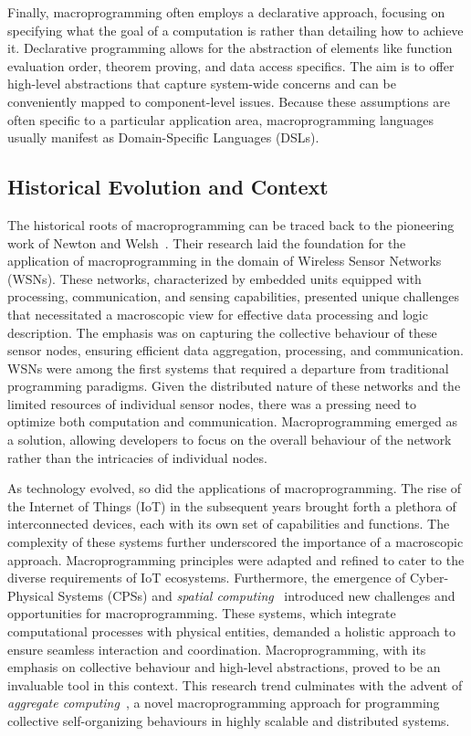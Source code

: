 Finally, macroprogramming often employs a declarative approach, 
 focusing on specifying what the goal of a computation is rather than detailing how to achieve it.
 Declarative programming allows for the abstraction of elements like function evaluation order, 
  theorem proving, and data access specifics. 
  The aim is to offer high-level abstractions that capture system-wide concerns and can be conveniently mapped to component-level issues. 
  Because these assumptions are often specific to a particular application area, macroprogramming languages usually manifest as Domain-Specific Languages (DSLs).
\subsection{Historical Evolution and Context}
The historical roots of macroprogramming can be traced back to the pioneering work of Newton and Welsh~\cite{newton2004region}. 
 Their research laid the foundation for the application of macroprogramming in the domain of Wireless Sensor Networks (WSNs). 
 These networks, characterized by embedded units equipped with processing, communication, and sensing capabilities, presented unique challenges that necessitated a macroscopic view for effective data processing and logic description. 
The emphasis was on capturing the collective behaviour of these sensor nodes, 
 ensuring efficient data aggregation, processing, and communication.
%
WSNs were among the first systems that required a departure from traditional programming paradigms. 
 Given the distributed nature of these networks and the limited resources of individual sensor nodes, 
 there was a pressing need to optimize both computation and communication. 
 Macroprogramming emerged as a solution, 
 allowing developers to focus on the overall behaviour of the network rather than the intricacies of individual nodes.

As technology evolved, so did the applications of macroprogramming. 
 The rise of the Internet of Things (IoT) in the subsequent years brought forth a plethora of interconnected devices, each with its own set of capabilities and functions. 
 The complexity of these systems further underscored the importance of a macroscopic approach. Macroprogramming principles were adapted and refined to cater to the diverse requirements of IoT ecosystems.
%
Furthermore, the emergence of Cyber-Physical Systems (CPSs) and \emph{spatial computing}~\cite{DBLP:journals/corr/abs-1202-5509} introduced new challenges and opportunities for macroprogramming. 
%
These systems, which integrate computational processes with physical entities,
 demanded a holistic approach to ensure seamless interaction and coordination. 
 Macroprogramming, with its emphasis on collective behaviour and high-level abstractions, 
 proved to be an invaluable tool in this context.
%
This research trend culminates with the advent of \emph{aggregate computing}~\cite{aggregatecomputing}, 
 a novel macroprogramming approach for programming collective self-organizing behaviours in highly scalable and distributed systems.
